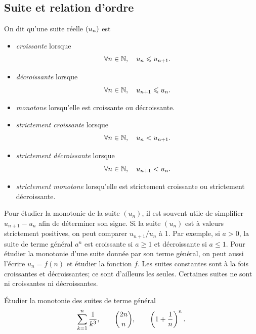 \documentclass{magnoliaold}
\begin{document}
\subsection{Suite et relation d'ordre}

\begin{definition}[utile=-3]
On dit qu'une suite réelle $\left(u_n\right)$ est
\begin{itemize}
\item \emph{croissante} lorsque
  \[\forall n\in\mathbb{N} ,\quad u_n \leqslant u_{n+1}.\]
\item \emph{décroissante} lorsque
  \[\forall n\in\mathbb{N} ,\quad u_{n+1} \leqslant u_n.\]
\item \emph{monotone} lorsqu'elle est croissante ou décroissante.
\item \emph{strictement croissante} lorsque
  \[\forall n\in\mathbb{N} ,\quad u_n < u_{n+1}.\]
\item \emph{strictement décroissante} lorsque
  \[\forall n\in\mathbb{N} ,\quad u_{n+1} < u_n.\]
\item \emph{strictement monotone} lorsqu'elle est strictement croissante ou
  strictement décroissante.
\end{itemize}
\end{definition}

\begin{remarques}
\remarque Pour étudier la monotonie de la suite $(u_n)$, il est souvent utile
  de simplifier $u_{n+1}-u_n$ afin de déterminer son signe.
  Si la suite $(u_n)$ est à valeurs strictement positives, on peut comparer
  $u_{n+1}/u_n$ à 1. Par exemple, si $a>0$, la suite de terme général $a^n$ est
  croissante si $a\geq 1$ et décroissante si $a\leq 1$.
\remarque Pour étudier la monotonie d'une suite donnée par son terme général,
  on peut aussi l'écrire $u_n=f(n)$ et étudier la fonction $f$.
\remarque Les suites constantes sont à la fois croissantes et décroissantes;
  ce sont d'ailleurs les seules. Certaines suites ne sont ni croissantes
  ni décroissantes.
\end{remarques}

\begin{exoUnique}
\exo Étudier la monotonie des suites de terme général
  \[\sum_{k=1}^n \frac{1}{k^3}, \qquad \binom{2n}{n}, %
    \qquad \p{1+\frac{1}{n}}^n.\]
\end{exoUnique}
\end{document}
